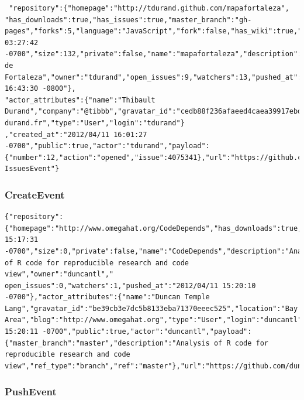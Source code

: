 \documentclass[a4paper,10pt]{article}
\begin{document}
\begin{lstlisting}
 "repository":{"homepage":"http://tdurand.github.com/mapafortaleza",
"has_downloads":true,"has_issues":true,"master_branch":"gh-pages","forks":5,"language":"JavaScript","fork":false,"has_wiki":true,"url":"https://github.com/tdurand/mapafortaleza","created_at":"2011/09/29 03:27:42 -0700","size":132,"private":false,"name":"mapafortaleza","description":"Mapa de Fortaleza","owner":"tdurand","open_issues":9,"watchers":13,"pushed_at":"2012/02/29 16:43:30 -0800"},
"actor_attributes":{"name":"Thibault Durand","company":"@tibbb","gravatar_id":"cedb88f236afaeed4caea39917ebd0a7","blog":"http://www.thibault-durand.fr","type":"User","login":"tdurand"}
,"created_at":"2012/04/11 16:01:27 -0700","public":true,"actor":"tdurand","payload":{"number":12,"action":"opened","issue":4075341},"url":"https://github.com/tdurand/mapafortaleza/issues/12","type":"
IssuesEvent"}
\end{lstlisting}

\subsubsection{CreateEvent}

\begin{lstlisting}
{"repository":{"homepage":"http://www.omegahat.org/CodeDepends","has_downloads":true,"has_issues":true,"forks":1,"fork":false,"has_wiki":true,"url":"https://github.com/duncantl/CodeDepends","created_at":"2012/04/11 15:17:31 -0700","size":0,"private":false,"name":"CodeDepends","description":"Analysis of R code for reproducible research and code view","owner":"duncantl","
open_issues":0,"watchers":1,"pushed_at":"2012/04/11 15:20:10 -0700"},"actor_attributes":{"name":"Duncan Temple Lang","gravatar_id":"be39cb3e7dc5b8133eba71370eeec525","location":"Bay Area","blog":"http://www.omegahat.org","type":"User","login":"duncantl"},"created_at":"2012/04/11 15:20:11 -0700","public":true,"actor":"duncantl","payload":{"master_branch":"master","description":"Analysis of R code for reproducible research and code view","ref_type":"branch","ref":"master"},"url":"https://github.com/duncantl/CodeDepends/compare/master","type":"CreateEvent"}
\end{lstlisting}


\subsubsection{PushEvent}
\end{document}
